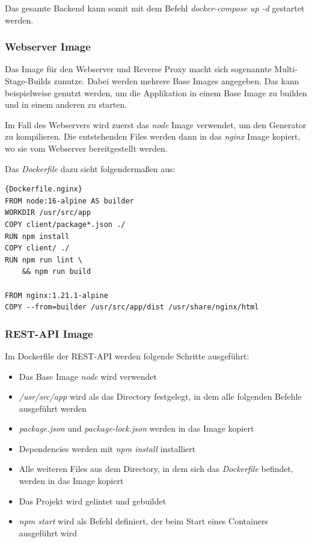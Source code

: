 Das gesamte Backend kann somit mit dem Befehl \textit{docker-compose up -d} gestartet werden.

\subsubsection{Webserver Image}
Das Image für den Webserver und Reverse Proxy macht sich sogenannte Multi-Stage-Builds zunutze.
Dabei werden mehrere Base Images angegeben.
Das kann beispielweise genutzt werden, um die Applikation in einem Base Image zu builden und in einem anderen
zu starten.

Im Fall des Webservers wird zuerst das \textit{node} Image verwendet, um den Generator zu kompilieren.
Die entstehenden Files werden dann in das \textit{nginx} Image kopiert, wo sie vom Webserver bereitgestellt werden.

Das \textit{Dockerfile} dazu sieht folgendermaßen aus:

\begin{lstlisting}[label={lst:Dockerfile.nginx}]{Dockerfile.nginx}
FROM node:16-alpine AS builder
WORKDIR /usr/src/app
COPY client/package*.json ./
RUN npm install
COPY client/ ./
RUN npm run lint \
    && npm run build

FROM nginx:1.21.1-alpine
COPY --from=builder /usr/src/app/dist /usr/share/nginx/html
\end{lstlisting}

\subsubsection{REST-API Image}
Im Dockerfile der REST-API werden folgende Schritte ausgeführt:

\begin{itemize}
    \item Das Base Image \textit{node} wird verwendet
    \item \textit{/usr/src/app} wird als das Directory festgelegt, in dem alle folgenden Befehle ausgeführt werden
    \item \textit{package.json} und \textit{package-lock.json} werden in das Image kopiert
    \item Dependencies werden mit \textit{npm install} installiert
    \item Alle weiteren Files aus dem Directory, in dem sich das \textit{Dockerfile} befindet, werden in das Image kopiert
    \item Das Projekt wird gelintet und gebuildet
    \item \textit{npm start} wird als Befehl definiert, der beim Start eines Containers ausgeführt wird
\end{itemize}

